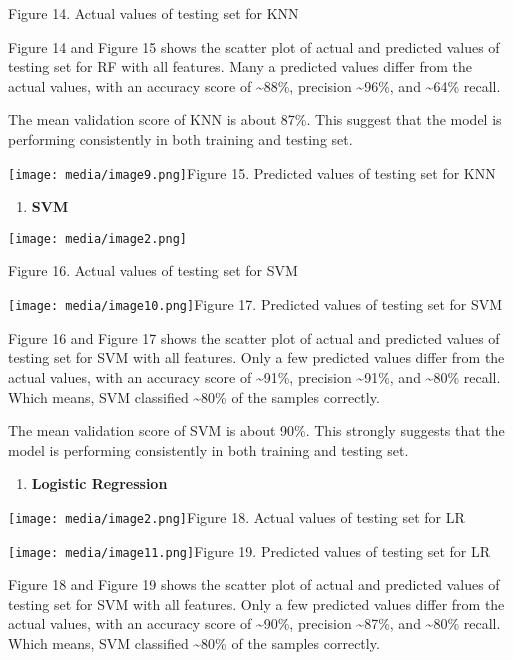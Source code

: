 \documentclass[
]{article}
\begin{document}
Figure 14. Actual values of testing set for KNN

Figure 14 and Figure 15 shows the scatter plot of actual and predicted
values of testing set for RF with all features. Many a predicted values
differ from the actual values, with an accuracy score of
\textasciitilde88\%, precision \textasciitilde96\%, and
\textasciitilde64\% recall.

The mean validation score of KNN is about 87\%. This suggest that the
model is performing consistently in both training and testing set.

\texttt{[image: media/image9.png]}Figure
15. Predicted values of testing set for KNN

\begin{enumerate}
\def\labelenumi{\alph{enumi})}
\setcounter{enumi}{1}
\item
  \textbf{SVM}
\end{enumerate}

\texttt{[image: media/image2.png]}

Figure 16. Actual values of testing set for SVM

\texttt{[image: media/image10.png]}Figure
17. Predicted values of testing set for SVM

Figure 16 and Figure 17 shows the scatter plot of actual and predicted
values of testing set for SVM with all features. Only a few predicted
values differ from the actual values, with an accuracy score of
\textasciitilde91\%, precision \textasciitilde91\%, and
\textasciitilde80\% recall. Which means, SVM classified
\textasciitilde80\% of the samples correctly.

The mean validation score of SVM is about 90\%. This strongly suggests
that the model is performing consistently in both training and testing
set.

\begin{enumerate}
\def\labelenumi{\alph{enumi})}
\setcounter{enumi}{2}
\item
  \textbf{Logistic Regression}
\end{enumerate}

\texttt{[image: media/image2.png]}Figure
18. Actual values of testing set for LR

\texttt{[image: media/image11.png]}Figure
19. Predicted values of testing set for LR

Figure 18 and Figure 19 shows the scatter plot of actual and predicted
values of testing set for SVM with all features. Only a few predicted
values differ from the actual values, with an accuracy score of
\textasciitilde90\%, precision \textasciitilde87\%, and
\textasciitilde80\% recall. Which means, SVM classified
\textasciitilde80\% of the samples correctly.
\end{document}
